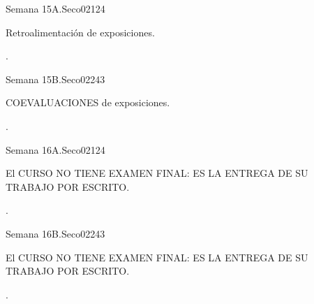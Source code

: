 \begin{syllabus}
\begin{unit}{Semana 15A.}{}{Seco02}{12}{4}
   \begin{topics}
      \item Retroalimentación de exposiciones.
   \end{topics}
   \begin{learningoutcomes}
      \item .
   \end{learningoutcomes}
\end{unit}

\begin{unit}{Semana 15B.}{}{Seco02}{24}{3}
   \begin{topics}
      \item COEVALUACIONES de exposiciones.
   \end{topics}

   \begin{learningoutcomes}
      \item .
      \end{learningoutcomes}
\end{unit}

\begin{unit}{Semana 16A.}{}{Seco02}{12}{4}
   \begin{topics}
      \item El CURSO NO TIENE EXAMEN FINAL: ES LA ENTREGA DE SU TRABAJO POR ESCRITO.
   \end{topics}
   \begin{learningoutcomes}
      \item .
   \end{learningoutcomes}
\end{unit}

\begin{unit}{Semana 16B.}{}{Seco02}{24}{3}
   \begin{topics}
      \item El CURSO NO TIENE EXAMEN FINAL: ES LA ENTREGA DE SU TRABAJO POR ESCRITO.
   \end{topics}

   \begin{learningoutcomes}
      \item .
      \end{learningoutcomes}
\end{unit}



\begin{coursebibliography}
\end{coursebibliography}

\end{syllabus}
